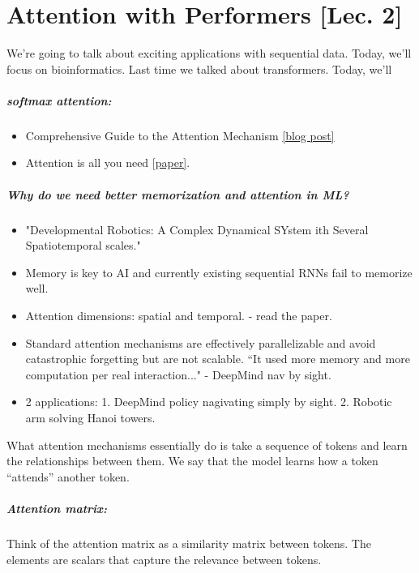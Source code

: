 \chapter{Attention with Performers [Lec. 2]}

We're going to talk about exciting applications with sequential data. Today, we'll focus on bioinformatics. Last time we talked about transformers. Today, we'll 

\paragraph*{softmax attention: } 
\begin{itemize}
	\item Comprehensive Guide to the Attention Mechanism \href{https://www.analyticsvidhya.com/blog/2019/11/comprehensive-guide-attention-mechanism-deep-learning/}{[blog post]}
	\item Attention is all you need \href{https://arxiv.org/pdf/1706.03762.pdf}{[paper]}.
\end{itemize}

\paragraph*{Why do we need better memorization and attention in ML?}
\begin{itemize}
	\item "Developmental Robotics: A Complex Dynamical SYstem ith Several Spatiotemporal scales."
	\item Memory is key to AI and currently existing sequential RNNs fail to memorize well. 
	\item Attention dimensions: spatial and temporal. - read the paper.
	\item Standard attention mechanisms are effectively parallelizable and avoid catastrophic forgetting but are not scalable. ``It used more memory and more computation per real interaction..." - DeepMind nav by sight.
	\item 2 applications: 1. DeepMind policy nagivating simply by sight. 2.  Robotic arm solving Hanoi towers. 
\end{itemize}

What attention mechanisms essentially do is take a sequence of tokens and learn the relationships between them. We say that the model learns how a token ``attends'' another token. 

\paragraph*{Attention matrix: }Think of the attention matrix as a similarity matrix between tokens. The elements are scalars that capture the relevance between tokens. 

